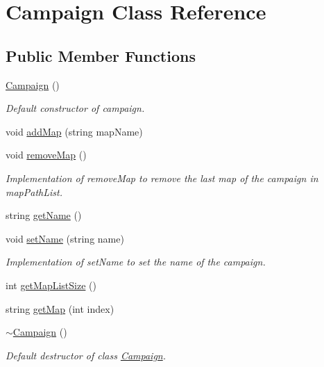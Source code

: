 \hypertarget{class_campaign}{}\section{Campaign Class Reference}
\label{class_campaign}
\subsection*{Public Member Functions}
\begin{DoxyCompactItemize}
\item 
\hypertarget{class_campaign_ae81c5b000e416b0ef31994efdf871c40}{}\label{class_campaign_ae81c5b000e416b0ef31994efdf871c40} 
\hyperlink{class_campaign_ae81c5b000e416b0ef31994efdf871c40}{Campaign} ()
\begin{DoxyCompactList}\small\item\em Default constructor of campaign. \end{DoxyCompactList}\item 
void \hyperlink{class_campaign_a51ee2b7f2cb73b5e2ed75577d8d36ee2}{add\+Map} (string map\+Name)
\item 
\hypertarget{class_campaign_aa27fbd216917d08ceed2a05d791f7c6a}{}\label{class_campaign_aa27fbd216917d08ceed2a05d791f7c6a} 
void \hyperlink{class_campaign_aa27fbd216917d08ceed2a05d791f7c6a}{remove\+Map} ()
\begin{DoxyCompactList}\small\item\em Implementation of remove\+Map to remove the last map of the campaign in map\+Path\+List. \end{DoxyCompactList}\item 
string \hyperlink{class_campaign_a9813a6cab4db158847e83031db891b2a}{get\+Name} ()
\item 
\hypertarget{class_campaign_a9b8cd5a9a9f37f85b174c5beb5894fb6}{}\label{class_campaign_a9b8cd5a9a9f37f85b174c5beb5894fb6} 
void \hyperlink{class_campaign_a9b8cd5a9a9f37f85b174c5beb5894fb6}{set\+Name} (string name)
\begin{DoxyCompactList}\small\item\em Implementation of set\+Name to set the name of the campaign. \end{DoxyCompactList}\item 
int \hyperlink{class_campaign_a0eff36282a94a37fd5860550d9f2a217}{get\+Map\+List\+Size} ()
\item 
string \hyperlink{class_campaign_a1502a3bc96675f347158932960bbbb27}{get\+Map} (int index)
\item 
\hypertarget{class_campaign_a5cca9e21e4c057ffe862d1447f538e49}{}\label{class_campaign_a5cca9e21e4c057ffe862d1447f538e49} 
\hyperlink{class_campaign_a5cca9e21e4c057ffe862d1447f538e49}{$\sim$\+Campaign} ()
\begin{DoxyCompactList}\small\item\em Default destructor of class \hyperlink{class_campaign}{Campaign}. \end{DoxyCompactList}\end{DoxyCompactItemize}
